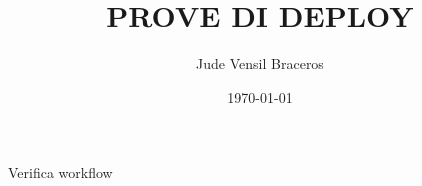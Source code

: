 \documentclass{article}
\title{PROVE DI DEPLOY}
\author{Jude Vensil Braceros}
\date{\today}
\begin{document}
\maketitle

Verifica workflow
\end{document}
